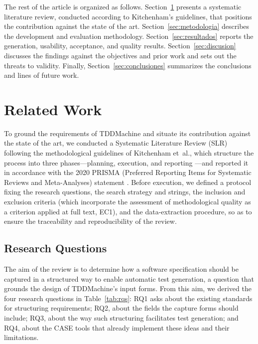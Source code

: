 \documentclass[10pt,journal,twoside,letterpaper]{IEEEtran}
\begin{document}
    The rest of the article is organized as follows. Section~\ref{sec:trabajos} presents a systematic literature review, conducted according to Kitchenham's guidelines, that positions the contribution against the state of the art. Section~\ref{sec:metodologia} describes the development and evaluation methodology. Section~\ref{sec:resultados} reports the generation, usability, acceptance, and quality results. Section~\ref{sec:discusion} discusses the findings against the objectives and prior work and sets out the threats to validity. Finally, Section~\ref{sec:conclusiones} summarizes the conclusions and lines of future work.
    
    \section{Related Work}
    \label{sec:trabajos}
    
    To ground the requirements of TDDMachine and situate its contribution against the state of the art, we conducted a Systematic Literature Review (SLR) following the methodological guidelines of Kitchenham et~al., which structure the process into three phases---planning, execution, and reporting \cite{kitchenham2009slr}---and reported it in accordance with the 2020 PRISMA (Preferred Reporting Items for Systematic Reviews and Meta-Analyses) statement \cite{prisma2020}. Before execution, we defined a protocol fixing the research questions, the search strategy and strings, the inclusion and exclusion criteria (which incorporate the assessment of methodological quality as a criterion applied at full text, EC1), and the data-extraction procedure, so as to ensure the traceability and reproducibility of the review.
    
    \subsection{Research Questions}
    \label{subsec:rqs}
    
    The aim of the review is to determine how a software specification should be captured in a structured way to enable automatic test generation, a question that grounds the design of TDDMachine's input forms. From this aim, we derived the four research questions in Table~\ref{tab:rqs}: RQ1 asks about the existing standards for structuring requirements; RQ2, about the fields the capture forms should include; RQ3, about the way such structuring facilitates test generation; and RQ4, about the CASE tools that already implement these ideas and their limitations.
    
\end{document}
